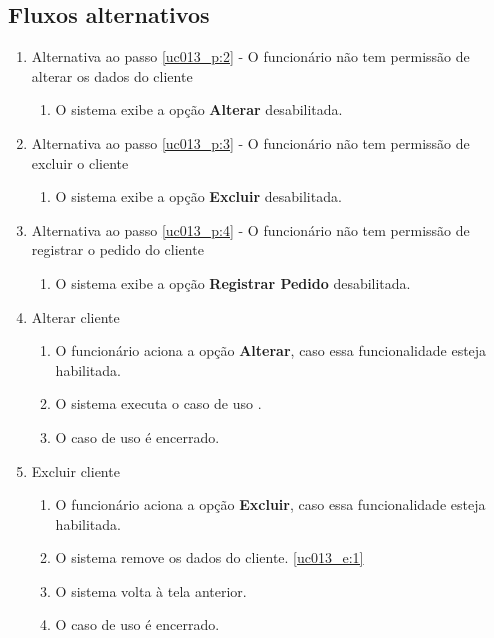 \subsection{Fluxos alternativos}

\begin{enumerate}[label=A\arabic*]
	\item Alternativa ao passo \ref{uc013_p:2} - O funcionário não tem permissão de alterar os dados do cliente \label{uc013_a:1}
	\begin{enumerate}[label*=.\arabic*]
		\item O sistema exibe a opção \textbf{Alterar} desabilitada.
	\end{enumerate}

	\item Alternativa ao passo \ref{uc013_p:3} - O funcionário não tem permissão de excluir o cliente \label{uc013_a:2}
	\begin{enumerate}[label*=.\arabic*]
		\item O sistema exibe a opção \textbf{Excluir} desabilitada.
	\end{enumerate}

	\item Alternativa ao passo \ref{uc013_p:4} - O funcionário não tem permissão de registrar o pedido do cliente \label{uc013_a:3}
	\begin{enumerate}[label*=.\arabic*]
		\item O sistema exibe a opção \textbf{Registrar Pedido} desabilitada.
	\end{enumerate}
	
	\item Alterar cliente
	\begin{enumerate}[label*=.\arabic*]
		\item O funcionário aciona a opção \textbf{Alterar}, caso essa funcionalidade esteja habilitada.
		\item O sistema executa o caso de uso .
		\item O caso de uso é encerrado.
	\end{enumerate}

	\item Excluir cliente
	\begin{enumerate}[label*=.\arabic*]
		\item O funcionário aciona a opção \textbf{Excluir}, caso essa funcionalidade esteja habilitada.
		\item O sistema remove os dados do cliente. \label{uc013_a:5:2}\ref{uc013_e:1}
		\item O sistema volta à tela anterior.
		\item O caso de uso é encerrado.
	\end{enumerate}


\end{enumerate}
